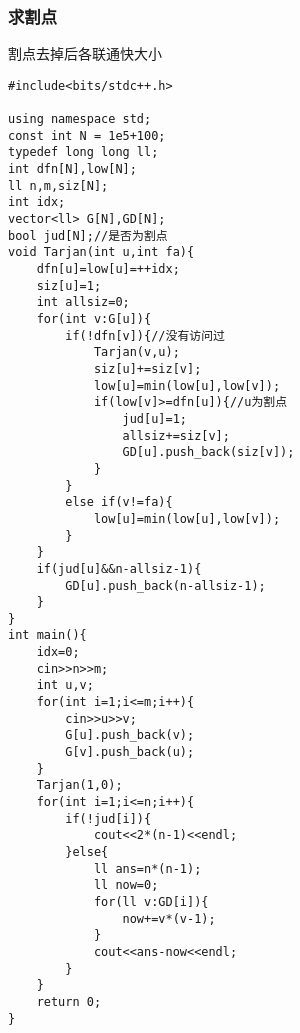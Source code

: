 \documentclass[twocolumn,a4]{article}
\begin{document}
\subsubsection{求割点}
割点去掉后各联通快大小
\begin{lstlisting}
#include<bits/stdc++.h>

using namespace std;
const int N = 1e5+100;
typedef long long ll;
int dfn[N],low[N];
ll n,m,siz[N];
int idx;
vector<ll> G[N],GD[N];
bool jud[N];//是否为割点
void Tarjan(int u,int fa){
    dfn[u]=low[u]=++idx;
    siz[u]=1;
    int allsiz=0;
    for(int v:G[u]){
        if(!dfn[v]){//没有访问过
            Tarjan(v,u);
            siz[u]+=siz[v];
            low[u]=min(low[u],low[v]);
            if(low[v]>=dfn[u]){//u为割点
                jud[u]=1;
                allsiz+=siz[v];
                GD[u].push_back(siz[v]);
            }
        }
        else if(v!=fa){
            low[u]=min(low[u],low[v]);
        }
    }
    if(jud[u]&&n-allsiz-1){
        GD[u].push_back(n-allsiz-1);
    }
}
int main(){
    idx=0;
    cin>>n>>m;
    int u,v;
    for(int i=1;i<=m;i++){
        cin>>u>>v;
        G[u].push_back(v);
        G[v].push_back(u);
    }
    Tarjan(1,0);
    for(int i=1;i<=n;i++){
        if(!jud[i]){
            cout<<2*(n-1)<<endl;
        }else{
            ll ans=n*(n-1);
            ll now=0;
            for(ll v:GD[i]){
                now+=v*(v-1);
            }
            cout<<ans-now<<endl;
        }
    }
    return 0;
}
\end{lstlisting}
\end{document}
